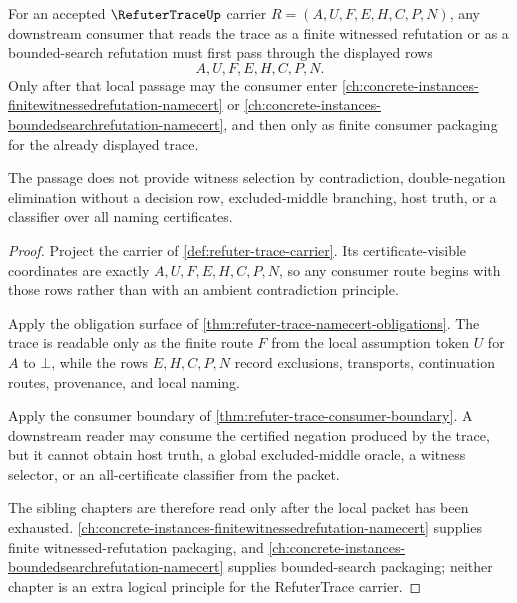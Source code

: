 \begin{theorem}
\label{thm:refuter-trace-finite-witnessed-boundary}
For an accepted $\RefuterTraceUp$ carrier $R=(A,U,F,E,H,C,P,N)$, any downstream consumer that reads the trace as a finite witnessed refutation or as a bounded-search refutation must first pass through the displayed rows
$$
A,U,F,E,H,C,P,N.
$$
Only after that local passage may the consumer enter \autoref{ch:concrete-instances-finitewitnessedrefutation-namecert} or \autoref{ch:concrete-instances-boundedsearchrefutation-namecert}, and then only as finite consumer packaging for the already displayed trace.

The passage does not provide witness selection by contradiction, double-negation elimination without a decision row, excluded-middle branching, host truth, or a classifier over all naming certificates.
\end{theorem}
\begin{proof}
Project the carrier of \autoref{def:refuter-trace-carrier}. Its certificate-visible coordinates are exactly $A,U,F,E,H,C,P,N$, so any consumer route begins with those rows rather than with an ambient contradiction principle.

Apply the obligation surface of \autoref{thm:refuter-trace-namecert-obligations}. The trace is readable only as the finite route $F$ from the local assumption token $U$ for $A$ to $\bot$, while the rows $E,H,C,P,N$ record exclusions, transports, continuation routes, provenance, and local naming.

Apply the consumer boundary of \autoref{thm:refuter-trace-consumer-boundary}. A downstream reader may consume the certified negation produced by the trace, but it cannot obtain host truth, a global excluded-middle oracle, a witness selector, or an all-certificate classifier from the packet.

The sibling chapters are therefore read only after the local packet has been exhausted. \autoref{ch:concrete-instances-finitewitnessedrefutation-namecert} supplies finite witnessed-refutation packaging, and \autoref{ch:concrete-instances-boundedsearchrefutation-namecert} supplies bounded-search packaging; neither chapter is an extra logical principle for the RefuterTrace carrier.
\end{proof}


